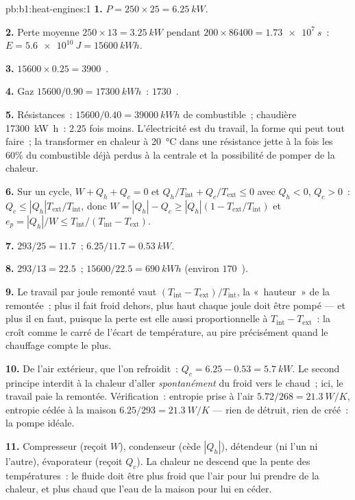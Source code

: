 \begin{solution}{pb:b1:heat-engines:1}
\textbf{1.} $P = 250 \times 25 = \qty{6.25}{kW}$.

\textbf{2.} Perte moyenne $250 \times 13 = \qty{3.25}{kW}$ pendant $200 \times 86400 =
\qty{1.73e7}{s}$~: $E = \qty{5.6e10}{J} = \qty{15600}{kW h}$.

\textbf{3.} $15600 \times 0.25 = 3900$~\texteuro.

\textbf{4.} Gaz $15600/0.90 = \qty{17300}{kW h}$~: $1730$~\texteuro.

\textbf{5.} Résistances~: $15600/0.40 = \qty{39000}{kW h}$ de combustible~;
chaudière \qty{17300}{kW h}~: $2.25$ fois moins. L'électricité est du travail,
la forme qui peut tout faire~; la transformer en chaleur à
\qty{20}{\degreeCelsius} dans une résistance jette à la fois les $60\%$ du
combustible déjà perdus à la centrale et la possibilité de pomper de la chaleur.

\textbf{6.} Sur un cycle, $W + Q_h + Q_c = 0$ et $Q_h/T_{\mathrm{int}} +
Q_c/T_{\mathrm{ext}} \leq 0$ avec $Q_h < 0$, $Q_c > 0$~: $Q_c \leq
|Q_h|T_{\mathrm{ext}}/T_{\mathrm{int}}$, donc $W = |Q_h| - Q_c \geq |Q_h|(1 -
T_{\mathrm{ext}}/T_{\mathrm{int}})$ et $e_p = |Q_h|/W \leq T_{\mathrm{int}}/(T_{\mathrm{int}} -
T_{\mathrm{ext}})$.

\textbf{7.} $293/25 = 11.7$~; $6.25/11.7 = \qty{0.53}{kW}$.

\textbf{8.} $293/13 = 22.5$~; $15600/22.5 = \qty{690}{kW h}$ (environ
$170$~\texteuro).

\textbf{9.} Le travail par joule remonté vaut $(T_{\mathrm{int}} - T_{\mathrm{ext}})/
T_{\mathrm{int}}$, la «~hauteur~» de la remontée~; plus il fait froid dehors,
plus haut chaque joule doit être pompé --- et plus il en faut, puisque la perte
est elle aussi proportionnelle à $T_{\mathrm{int}} - T_{\mathrm{ext}}$~: la
 croît comme le carré de l'écart de température, au pire
précisément quand le chauffage compte le plus.

\textbf{10.} De l'air extérieur, que l'on refroidit~: $Q_c = 6.25 - 0.53 =
\qty{5.7}{kW}$. Le second principe interdit à la chaleur d'aller
\emph{spontanément} du froid vers le chaud~; ici, le travail paie la remontée.
Vérification~: entropie prise à l'air $5.72/268 = \qty{21.3}{W/K}$, entropie
cédée à la maison $6.25/293 =
\qty{21.3}{W/K}$ --- rien de détruit, rien de créé~: la pompe idéale.

\textbf{11.} Compresseur (reçoit $W$), condenseur (cède $|Q_h|$), détendeur
(ni l'un ni l'autre), évaporateur (reçoit $Q_c$). La chaleur ne descend que la
pente des températures~: le fluide doit être plus froid que l'air pour lui
prendre de la chaleur, et plus chaud que l'eau de la maison pour lui en céder.


\end{solution}
